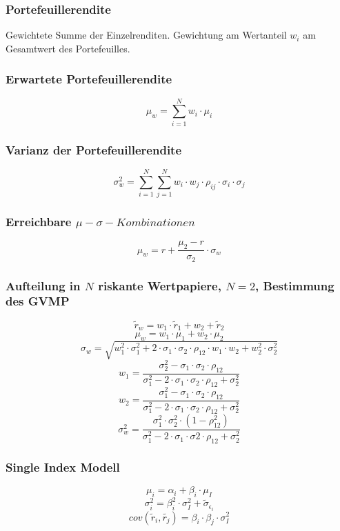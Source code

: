 \subsubsection{Portefeuillerendite}
Gewichtete Summe der Einzelrenditen. Gewichtung am Wertanteil \(w_i\) am Gesamtwert des Portefeuilles.

\subsubsection{Erwartete Portefeuillerendite}
\[\mu_w = \sum_{i=1}^{N} w_i \cdot \mu_i\]

\subsubsection{Varianz der Portefeuillerendite}
\[\sigma_w^2 = \sum_{i=1}^{N}\sum_{j=1}^{N} w_i \cdot w_j \cdot \rho_{ij} \cdot \sigma_i \cdot \sigma_j\]

\subsubsection{Erreichbare \(\mu-\sigma-Kombinationen\)}
\[\mu_w = r + \frac{\mu_2 - r}{\sigma_2} \cdot \sigma_w \]


\subsubsection{Aufteilung in \(N\) riskante Wertpapiere, \(N = 2\), Bestimmung des GVMP}
\[\tilde{r}_w = w_1 \cdot \tilde{r}_1 + w_2 + \tilde{r}_2\]
\[\mu_w = w_1 \cdot \mu_1 + w_2 \cdot \mu_2\]
\[\sigma_w = \sqrt{w_1^2 \cdot \sigma_1^2 + 2 \cdot \sigma_1 \cdot \sigma_2 \cdot \rho_{12} \cdot w_1 \cdot w_2 + w_2^2 \cdot \sigma_2^2}\]
\[w_1 = \frac{\sigma_2^2-\sigma_1 \cdot \sigma_2 \cdot \rho_{12}}{\sigma_1^2-2 \cdot \sigma_1 \cdot \sigma_2 \cdot \rho_{12} + \sigma_2^2}\]
\[w_2 = \frac{\sigma_1^2 - \sigma_1 \cdot \sigma_2 \cdot \rho_{12}}{\sigma_1^2 - 2 \cdot \sigma_1 \cdot \sigma_2 \cdot \rho_{12} + \sigma_2^2}\]
\[\sigma_w^2 = \frac{\sigma_1^2 \cdot \sigma_2^2 \cdot (1 - \rho_{12}^2)}{\sigma_1^2 - 2 \cdot \sigma_1 \cdot \sigma2 \cdot \rho_{12} + \sigma_2^2}\]

\subsubsection{Single Index Modell}
\[\mu_i = \alpha_i + \beta_i \cdot \mu_I\]
\[\sigma_i^2 = \beta_i^2 \cdot \sigma_I^2 + \tilde{\sigma}_{\epsilon_i}\]
\[cov(\tilde{r}_i, \tilde{r_j}) = \beta_i \cdot \beta_j \cdot \sigma_I^2\]


